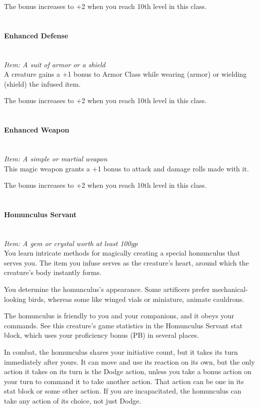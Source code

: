 \documentclass[letterpaper,openany,oneside,twocolumn]{book}
\begin{document}
The bonus increases to +2 when you reach 10th level in this class.\\\\
\paragraph*{Enhanced Defense}\hfill\\
\textit{Item: A suit of armor or a shield}\\
A creature gains a +1 bonus to Armor Class while wearing (armor) or wielding (shield) the infused item.

The bonus increases to +2 when you reach 10th level in this class.\\\\
\paragraph*{Enhanced Weapon}\hfill\\
\textit{Item: A simple or martial weapon}\\
This magic weapon grants a +1 bonus to attack and damage rolls made with it.

The bonus increases to +2 when you reach 10th level in this class.\\\\
\paragraph*{Homunculus Servant}\hfill\\
\textit{Item: A gem or crystal worth at least 100gp}\\
You learn intricate methods for magically creating a special homunculus that serves you. The item you infuse serves as the creature's heart, around which the creature's body instantly forms.

You determine the homunculus's appearance. Some artificers prefer mechanical-looking birds, whereas some like winged vials or miniature, animate cauldrons.

The homunculus is friendly to you and your companions, and it obeys your commands. See this creature's game statistics in the Homunculus Servant stat block, which uses your proficiency bonus (PB) in several places.

In combat, the homunculus shares your initiative count, but it takes its turn immediately after yours. It can move and use its reaction on its own, but the only action it takes on its turn is the Dodge action, unless you take a bonus action on your turn to command it to take another action. That action can be one in its stat block or some other action. If you are incapacitated, the homunculus can take any action of its choice, not just Dodge.
\end{document}
